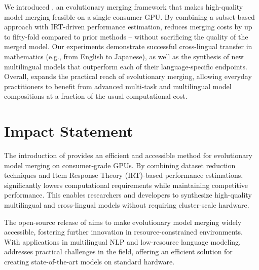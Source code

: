 We introduced \approachns{}, an evolutionary merging framework that makes high-quality model merging feasible on a single consumer GPU. By combining a subset-based approach with IRT-driven performance estimation, \approachns{} reduces merging costs by up to fifty-fold compared to prior methods -- without sacrificing the quality of the merged model. Our experiments demonstrate successful cross-lingual transfer in mathematics (e.g., from English to Japanese), as well as the synthesis of new multilingual models that outperform each of their language-specific endpoints. Overall, \approachns{} expands the practical reach of evolutionary merging, allowing everyday practitioners to benefit from advanced multi-task and multilingual model compositions at a fraction of the usual computational cost.

\section*{Impact Statement}
The introduction of \approach provides an efficient and accessible method for evolutionary model merging on consumer-grade GPUs. By combining dataset reduction techniques and Item Response Theory (IRT)-based performance estimations, \approachns{} significantly lowers computational requirements while maintaining competitive performance. This enables researchers and developers to synthesize high-quality multilingual and cross-lingual models without requiring cluster-scale hardware.

The open-source release of \approach aims to make evolutionary model merging widely accessible, fostering further innovation in resource-constrained environments. With applications in multilingual NLP and low-resource language modeling, \approach addresses practical challenges in the field, offering an efficient solution for creating state-of-the-art models on standard hardware.